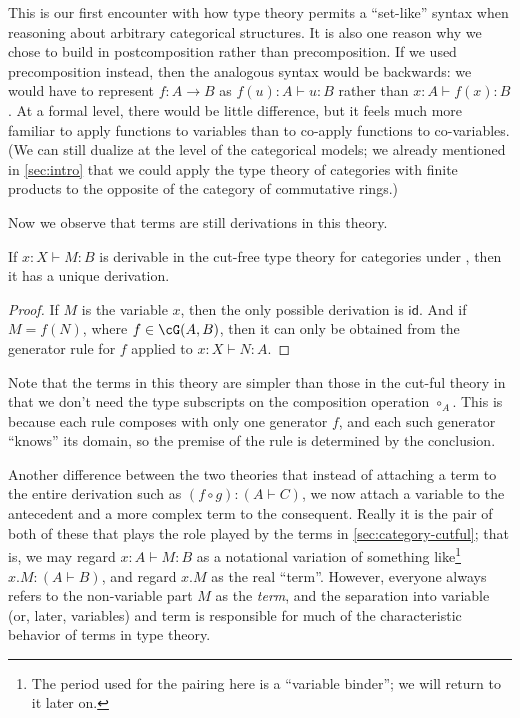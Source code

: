 \documentclass{book}
\def\idfunc{\mathsf{id}}
\let\types\vdash
\def\comp#1{\circ_{#1}}
\begin{document}
This is our first encounter with how type theory permits a ``set-like'' syntax when reasoning about arbitrary categorical structures.
It is also one reason why we chose to build in postcomposition rather than precomposition.
If we used precomposition instead, then the analogous syntax would be backwards: we would have to represent $f:A\to B$ as $f(u):A \types u:B$ rather than $x:A \types f(x):B$.
At a formal level, there would be little difference, but it feels much more familiar to apply functions to variables than to co-apply functions to co-variables.
(We can still dualize at the level of the categorical models; we already mentioned in \cref{sec:intro} that we could apply the type theory of categories with finite products to the opposite of the category of commutative rings.)

Now we observe that terms are still derivations in this theory.

\begin{lem}\label{thm:category-tad}
  If $x:X \types M:B$ is derivable in the cut-free type theory for categories under \cG, then it has a unique derivation.
\end{lem}
\begin{proof}
  If $M$ is the variable $x$, then the only possible derivation is $\idfunc$.
  And if $M = f(N)$, where $f\in\cG(A,B)$, then it can only be obtained from the generator rule for $f$ applied to $x:X \types N:A$.
\end{proof}

Note that the terms in this theory are simpler than those in the cut-ful theory in that we don't need the type subscripts on the composition operation $\comp{A}$.
This is because each rule composes with only one generator $f$, and each such generator ``knows'' its domain, so the premise of the rule is determined by the conclusion.

Another difference between the two theories that instead of attaching a term to the entire derivation such as $(f\circ g): (A\types C)$, we now attach a variable to the antecedent and a more complex term to the consequent.
Really it is the pair of both of these that plays the role played by the terms in \cref{sec:category-cutful}; that is, we may regard $x:A \types M:B$ as a notational variation of something like\footnote{The period used for the pairing here is a ``variable binder''; we will return to it later on.} $x.M:(A\types B)$, and regard $x.M$ as the real ``term''.
However, everyone always refers to the non-variable part $M$ as the \emph{term}, and the separation into variable (or, later, variables) and term is responsible for much of the characteristic behavior of terms in type theory.
\end{document}
